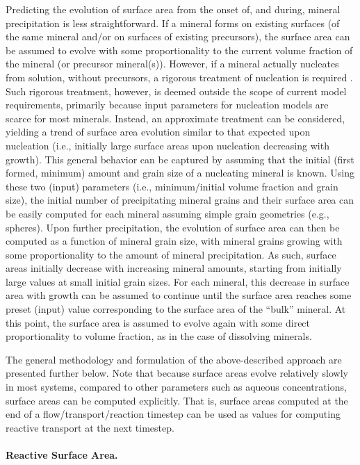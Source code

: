 Predicting the evolution of surface area from the onset of, and
during, mineral precipitation is less straightforward.  If a mineral
forms on existing surfaces (of the same mineral and/or on surfaces of
existing precursors), the surface area can be assumed to evolve with
some proportionality to the current volume fraction of the mineral (or
precursor mineral(s)).  However, if a mineral actually nucleates from
solution, without precursors, a rigorous treatment of nucleation is
required \citep{steefel1990new}.  Such rigorous treatment, however, is
deemed outside the scope of current model requirements, primarily
because input parameters for nucleation models are scarce for most
minerals.  Instead, an approximate treatment can be considered,
yielding a trend of surface area evolution similar to that expected
upon nucleation (i.e., initially large surface areas upon nucleation
decreasing with growth).  This general behavior can be captured by
assuming that the initial (first formed, minimum) amount and grain
size of a nucleating mineral is known.  Using these two (input)
parameters (i.e., minimum/initial volume fraction and grain size), the
initial number of precipitating mineral grains and their surface area
can be easily computed for each mineral assuming simple grain
geometries (e.g., spheres).  Upon further precipitation, the evolution
of surface area can then be computed as a function of mineral grain
size, with mineral grains growing with some proportionality to the
amount of mineral precipitation.  As such, surface areas initially
decrease with increasing mineral amounts, starting from initially
large values at small initial grain sizes.  For each mineral, this
decrease in surface area with growth can be assumed to continue until
the surface area reaches some preset (input) value corresponding to
the surface area of the ``bulk'' mineral.  At this point, the surface
area is assumed to evolve again with some direct proportionality to
volume fraction, as in the case of dissolving minerals.

The general methodology and formulation of the above-described
approach are presented further below.  Note that because surface areas
evolve relatively slowly in most systems, compared to other parameters
such as aqueous concentrations, surface areas can be computed
explicitly.  That is, surface areas computed at the end of a
flow/transport/reaction timestep can be used as values for computing
reactive transport at the next timestep.

\paragraph{Reactive Surface Area.}

